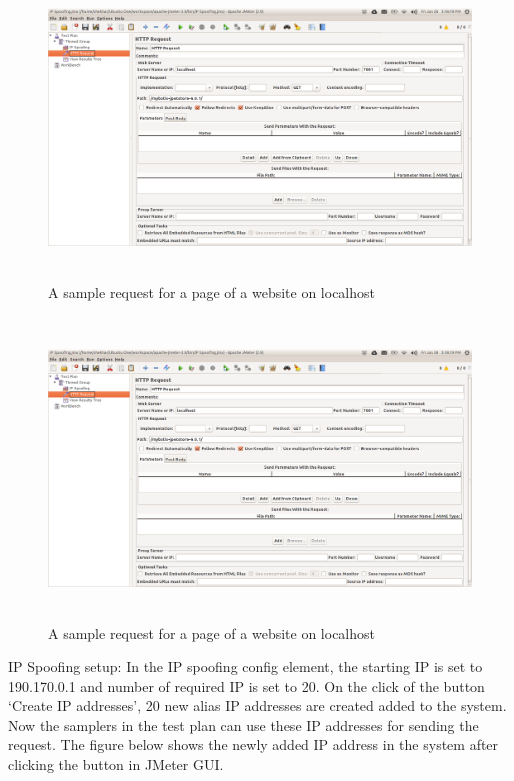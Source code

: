 \documentclass[12pt]{book}
\begin{document}
  
  \begin{figure}[H]
   \centering
   \includegraphics[width=15cm, height=8cm]{images/ip_82}
   \caption{A sample request for a page of a website on localhost\label{fig:fig85_JMeter}}
  \end{figure}

   \begin{figure}[H]
   \centering
   \includegraphics[width=15cm, height=8cm]{images/ip_82}
   \caption{A sample request for a page of a website on localhost\label{fig:fig85_JMeter}}
  \end{figure}
  
    
  IP Spoofing setup: In the IP spoofing config element, the starting IP is set to 190.170.0.1 and number of required IP is set to 20. 
On the click of the button ‘Create IP addresses’, 20 new alias IP addresses are created added to the system. Now the samplers in the
test plan can use these IP addresses for sending the request. The figure below shows the newly added IP address in the system after
clicking the button in JMeter GUI.
\end{document}
